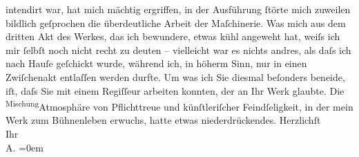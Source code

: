 \begin{ledgroupsized}[t]{13cm}
               intendirt war, hat mich mächtig ergriffen, in der Ausführung ſtörte mich zuweilen
               bildlich {\pb}geſprochen die überdeutliche Arbeit der
               Maſchinerie. Was mich aus dem dritten Akt des Werkes, das ich bewundere, etwas kühl angeweht hat, weiſs
               ich mir ſelbſt noch nicht recht zu deuten – vielleicht war es nichts andres, als daſs
               ich nach Hauſe geſchickt wurde, während ich, in höherm Sinn, nur in einen Zwiſchenakt
               entlaſſen werden durfte. Um was ich Sie diesmal beſonders beneide, iſt, daſs Sie mit
               einem Regiſſeur arbeiten
               konnten, der an Ihr Werk glaubte. Die \substVorne{}\textsuperscript{Mischung}{\allowbreak}\substDazwischen{}Atmosphäre\substHinten{} von Pflichttreue und künſtleriſcher Feindſeligkeit, in der  mein Werk zum Bühnenleben erwuchs, hatte {\pb}etwas niederdrückendes.\pend
           \pstart
           Herzlichſt{\\[\baselineskip]}Ihr{\\[\baselineskip]}\spacefill\mbox{A.}\pend
           \leftskip=0em{}
         
         \endnumbering{}\end{ledgroupsized}  \newcommand{\dateiname}{L01587}\newcommand{\titel}{Arthur Schnitzler an Hugo von Hofmannsthal, 6. 3. 1906}\newcommand{\editorInnen}{Martin Anton Müller und Gerd-Hermann Susen}
      